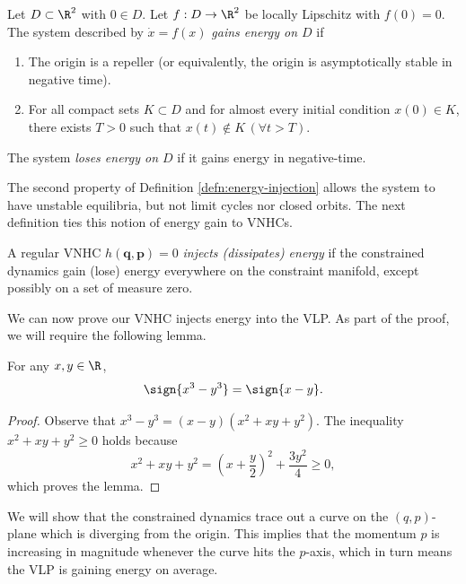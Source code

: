 \begin{defn}\label{defn:energy-injection}
   Let \(D \subset \R^2\) with \(0 \in D\).
   Let \(f : D \rightarrow \R^2\) be locally Lipschitz with \(f(0) = 0\).
   The system described by \(\dot{x} = f(x)\) 
   \textit{gains energy on \(D\)} if 
   \begin{enumerate}
      \item The origin is a repeller 
         (or equivalently, the origin is asymptotically stable in negative time).
      \item For all compact sets \(K \subset D\) and for almost every initial
         condition \(x(0) \in K\), there exists \(T > 0\) such
         that \(x(t) \not \in K \, (\forall t > T)\).
   \end{enumerate}
   The system \textit{loses energy on \(D\)} if it gains energy in
   negative-time.
\end{defn}

The second property of Definition \ref{defn:energy-injection} allows the system
to have unstable equilibria, but not limit cycles nor closed orbits.
The next definition ties this notion of energy gain to VNHCs.

\begin{defn}
   A regular VNHC \(h(\mathbf{q},\mathbf{p}) = 0\) 
   \textit{injects (dissipates) energy} if the constrained dynamics gain (lose)
   energy everywhere on the constraint manifold, except possibly on a set of
   measure zero.
\end{defn}

We can now prove our VNHC injects energy into the VLP. 
As part of the proof, we will require the following lemma.

\begin{lemma}\label{lemma:sign-of-cube}
   For any \(x,y \in \R\),
   \[
      \sign{x^3 - y^3} = \sign{x-y}
      .
   \]
\end{lemma}
\begin{proof}
   Observe that \(x^3 - y^3 =  (x-y)(x^2 + xy + y^2)\).
   The inequality \(x^2 + xy + y^2 \geq 0\) holds because
   \[
      x^2 + xy + y^2 = \left(x  + \frac{y}{2}\right)^2 + \frac{3y^2}{4} \geq 0
      ,
   \]
   which proves the lemma.
\end{proof}

We will show that the constrained dynamics trace out a curve on the
\((q,p)\)-plane which is diverging from the origin.  
This implies that the momentum \(p\) is increasing in magnitude whenever the
curve hits the \(p\)-axis, which in turn means the VLP is gaining energy on
average.

